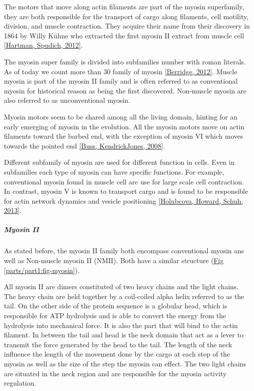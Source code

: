 \documentclass[A4paperpaper,11pt,english]{sphinxmanual}
\begin{document}
The motors that move along actin filaments are part of the myosin superfamily, they
are both responsible for the transport of cargo along filaments, cell motility,
division, and muscle contraction. They acquire their name from their discovery
in 1864 by Willy Kühne who extracted the first myosin II extract from muscle
cell {\hyperref[parts/part1:hartman2012]{{[}Hartman, Spudich,  2012{]}}}.

The myosin super family is divided into subfamilies number with roman literals.
As of today we count more than 30 family of myosin {\hyperref[parts/part1:berridge2012a]{{[}Berridge,  2012{]}}}.
Muscle myosin is part of the myosin II family and is often referred to  as
conventional myosin for historical reason as being the first discovered.
Non-muscle  myosin are also referred to as unconventional myosin.

Myosin motors seem to be shared among all the living domain, hinting for an
early emerging of myosin in the evolution. All the myosin motors move on actin
filaments toward the barbed end, with the exception of myosin VI which moves
towards the pointed end {\hyperref[parts/part1:buss2008]{{[}Buss, KendrickJones,  2008{]}}}.

Different subfamily of myosin are used for different function in cells. Even in
subfamilies each type of myosin can have specific functions. For example,
conventional myosin found in muscle cell are use for large scale cell
contraction. In contrast, myosin V is known to transport cargo and is found to
be responsible for actin network dynamics and vesicle positioning
{\hyperref[parts/part1:holubcova2013]{{[}Holubcova, Howard, Schuh,  2013{]}}}.


\subparagraph{Myosin II}
\label{parts/part1:myosin-ii}\label{parts/part1:myoii}
As stated before, the myosin II family both encompass conventional myosin ans
well as Non-muscle myosin II (NMII). Both have a similar structure (\hyperref[parts/part1:fig-myosin]{Fig  \ref*{parts/part1:fig-myosin}}).

All myosin II are dimers constituted of two heavy chains and the light chains. The
heavy chain are held together by a coil-coiled alpha helix referred to as the
tail. On the other side of the protein sequence is a globular head, which is
responsible for ATP hydrolysis and is able to convert the energy from the
hydrolysis into mechanical force. It is also the part that will bind to the
actin filament. In between the tail and head is the neck domain that act as a
lever to transmit the force generated by the head to the tail. The length of
the neck influence the length of the movement done by the cargo at each step of
the myosin as well as the size of the step the myosin can effect. The two light
chains are situated in the neck region and are responsible for the myosin
activity regulation.
\end{document}
